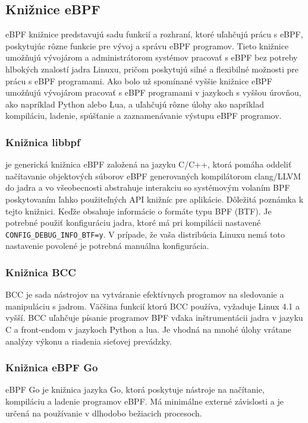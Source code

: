 \subsection{Knižnice eBPF} 
eBPF knižnice predstavujú sadu funkcií a rozhraní, ktoré uľahčujú prácu s eBPF, poskytujúc rôzne funkcie pre vývoj a správu eBPF programov. 
Tieto knižnice umožňujú vývojárom a administrátorom systémov pracovať s eBPF bez potreby hlbokých znalostí jadra Linuxu, pričom poskytujú 
silné a flexibilné možnosti pre prácu s eBPF programami. Ako bolo už spomínané vyššie knižnice eBPF umožňujú vývojárom pracovať s eBPF programami 
v jazykoch s vyššou úrovňou, ako napríklad Python alebo Lua, a uľahčujú rôzne úlohy ako napríklad kompiláciu, ladenie, spúšťanie a zaznamenávanie 
výstupu eBPF programov. 

\subsubsection{Knižnica libbpf}
je generická knižnica eBPF založená na jazyku C/C++, ktorá pomáha oddeliť načítavanie objektových súborov  eBPF generovaných kompilátorom clang/LLVM do jadra a vo 
všeobecnosti abstrahuje interakciu so systémovým volaním BPF poskytovaním ľahko použiteľných API knižníc pre aplikácie. Dôležitá poznámka k tejto knižnici. 
Keďže obsahuje informácie o formáte typu BPF (BTF). Je potrebné použiť konfiguráciu jadra, ktoré má pri kompilácii nastavené \texttt{CONFIG\_DEBUG\_INFO\_BTF=y}. 
V prípade, že vaša distribúcia Linuxu nemá toto nastavenie povolené je potrebná manuálna konfigurácia.

\subsubsection{Knižnica BCC}
BCC je sada nástrojov na vytváranie efektívnych programov na sledovanie a manipuláciu s jadrom. Väčšina funkcií ktorú BCC používa, vyžaduje Linux 4.1 a vyšší. 
BCC uľahčuje písanie programov BPF vďaka inštrumentácii jadra v jazyku C a front-endom v jazykoch Python a lua. Je vhodná na mnohé úlohy vrátane analýzy výkonu a 
riadenia sieťovej prevádzky.

\subsubsection{Knižnica eBPF Go}
eBPF Go je knižnica jazyka Go, ktorá poskytuje nástroje na načítanie, kompiláciu a ladenie programov eBPF. Má minimálne externé závislosti 
a je určená na používanie v dlhodobo bežiacich procesoch. 

